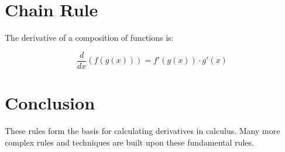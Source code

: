 \section{Chain Rule}

The derivative of a composition of functions is:

\begin{equation}
\frac{d}{dx}(f(g(x))) = f'(g(x)) \cdot g'(x)
\end{equation}

\section{Conclusion}

These rules form the basis for calculating derivatives in
calculus. Many more complex rules and techniques are built upon these
fundamental rules.
